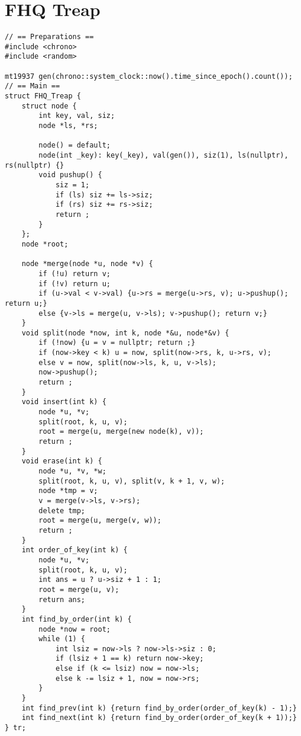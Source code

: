 \section{FHQ Treap}

\begin{verbatim}
// == Preparations ==
#include <chrono>
#include <random>

mt19937 gen(chrono::system_clock::now().time_since_epoch().count());
// == Main ==
struct FHQ_Treap {
    struct node {
        int key, val, siz;
        node *ls, *rs;

        node() = default;
        node(int _key): key(_key), val(gen()), siz(1), ls(nullptr), rs(nullptr) {}
        void pushup() {
            siz = 1;
            if (ls) siz += ls->siz;
            if (rs) siz += rs->siz;
            return ;
        }
    };
    node *root;

    node *merge(node *u, node *v) {
        if (!u) return v;
        if (!v) return u;
        if (u->val < v->val) {u->rs = merge(u->rs, v); u->pushup(); return u;}
        else {v->ls = merge(u, v->ls); v->pushup(); return v;}
    }
    void split(node *now, int k, node *&u, node*&v) {
        if (!now) {u = v = nullptr; return ;}
        if (now->key < k) u = now, split(now->rs, k, u->rs, v);
        else v = now, split(now->ls, k, u, v->ls);
        now->pushup();
        return ;
    }
    void insert(int k) {
        node *u, *v;
        split(root, k, u, v);
        root = merge(u, merge(new node(k), v));
        return ;
    }
    void erase(int k) {
        node *u, *v, *w;
        split(root, k, u, v), split(v, k + 1, v, w);
        node *tmp = v;
        v = merge(v->ls, v->rs);
        delete tmp;
        root = merge(u, merge(v, w));
        return ;
    }
    int order_of_key(int k) {
        node *u, *v;
        split(root, k, u, v);
        int ans = u ? u->siz + 1 : 1;
        root = merge(u, v);
        return ans;
    }
    int find_by_order(int k) {
        node *now = root;
        while (1) {
            int lsiz = now->ls ? now->ls->siz : 0;
            if (lsiz + 1 == k) return now->key;
            else if (k <= lsiz) now = now->ls;
            else k -= lsiz + 1, now = now->rs;
        }
    }
    int find_prev(int k) {return find_by_order(order_of_key(k) - 1);}
    int find_next(int k) {return find_by_order(order_of_key(k + 1));}
} tr;
\end{verbatim}